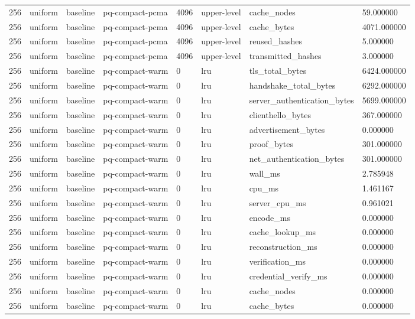 \begin{tabular}{llllllll}
256 & uniform & baseline & pq-compact-pcma & 4096 & upper-level & cache\_nodes & 59.000000 \\
256 & uniform & baseline & pq-compact-pcma & 4096 & upper-level & cache\_bytes & 4071.000000 \\
256 & uniform & baseline & pq-compact-pcma & 4096 & upper-level & reused\_hashes & 5.000000 \\
256 & uniform & baseline & pq-compact-pcma & 4096 & upper-level & transmitted\_hashes & 3.000000 \\
256 & uniform & baseline & pq-compact-warm & 0 & lru & tls\_total\_bytes & 6424.000000 \\
256 & uniform & baseline & pq-compact-warm & 0 & lru & handshake\_total\_bytes & 6292.000000 \\
256 & uniform & baseline & pq-compact-warm & 0 & lru & server\_authentication\_bytes & 5699.000000 \\
256 & uniform & baseline & pq-compact-warm & 0 & lru & clienthello\_bytes & 367.000000 \\
256 & uniform & baseline & pq-compact-warm & 0 & lru & advertisement\_bytes & 0.000000 \\
256 & uniform & baseline & pq-compact-warm & 0 & lru & proof\_bytes & 301.000000 \\
256 & uniform & baseline & pq-compact-warm & 0 & lru & net\_authentication\_bytes & 301.000000 \\
256 & uniform & baseline & pq-compact-warm & 0 & lru & wall\_ms & 2.785948 \\
256 & uniform & baseline & pq-compact-warm & 0 & lru & cpu\_ms & 1.461167 \\
256 & uniform & baseline & pq-compact-warm & 0 & lru & server\_cpu\_ms & 0.961021 \\
256 & uniform & baseline & pq-compact-warm & 0 & lru & encode\_ms & 0.000000 \\
256 & uniform & baseline & pq-compact-warm & 0 & lru & cache\_lookup\_ms & 0.000000 \\
256 & uniform & baseline & pq-compact-warm & 0 & lru & reconstruction\_ms & 0.000000 \\
256 & uniform & baseline & pq-compact-warm & 0 & lru & verification\_ms & 0.000000 \\
256 & uniform & baseline & pq-compact-warm & 0 & lru & credential\_verify\_ms & 0.000000 \\
256 & uniform & baseline & pq-compact-warm & 0 & lru & cache\_nodes & 0.000000 \\
256 & uniform & baseline & pq-compact-warm & 0 & lru & cache\_bytes & 0.000000 \\

\end{tabular}
